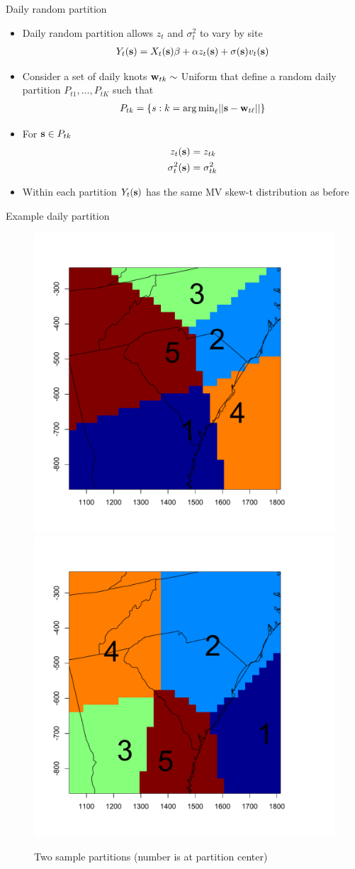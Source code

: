 \documentclass{beamer}
\begin{document}
\begin{frame}{Daily random partition}
  \begin{itemize} \setlength{\itemsep}{0.5em}
    \item Daily random partition allows $z_t$ and $\sigma^2_t$ to vary by site
    \begin{align*}
      Y_t(\mbox{\bf s}) = X_t(\mbox{\bf s}) \beta + \alpha z_t(\mbox{\bf s}) + \sigma(\mbox{\bf s}) v_t(\mbox{\bf s})
    \end{align*}
    \item Consider a set of daily knots $\mbox{\bf w}_{tk} \sim$ Uniform that define a random daily partition
    $P_{t1}, \ldots, P_{tK}$ such that
    \begin{align*}
      P_{tk} = \{s : k = {\mathop{\rm arg\, min}}_\ell|| \mbox{\bf s} - \mbox{\bf w}_{t\ell}|| \}
    \end{align*}
    \item For $\mbox{\bf s} \in P_{tk}$
    \begin{align*}
      z_t(\mbox{\bf s}) &= z_{tk}\\
      \sigma^2_t(\mbox{\bf s}) &= \sigma^2_{tk}
    \end{align*}
    \item Within each partition $Y_t(\mbox{\bf s})$ has the same MV skew-t distribution as before
  \end{itemize}
\end{frame}

\begin{frame}{Example daily partition}
    \centering
    \begin{figure}
    \includegraphics[width=0.54\linewidth]{./plots/pot/example-partition-1.pdf}
    \includegraphics[width=0.54\linewidth]{./plots/pot/example-partition-2.pdf}
    \caption{Two sample partitions (number is at partition center)}
    \end{figure}
\end{frame}
\end{document}
